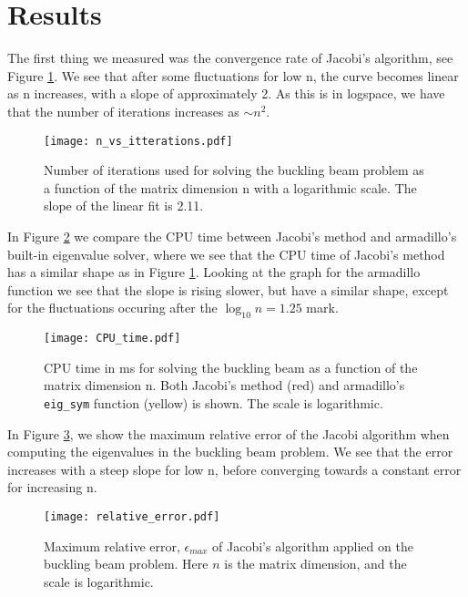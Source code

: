 \section{Results}
\label{sec:results}

The first thing we measured was the convergence rate of Jacobi's algorithm, see Figure \ref{fig:n_vs_it}.
We see that after some fluctuations for low n, the curve becomes linear as n increases, with a slope of approximately 2.
As this is in logspace, we have that the number of iterations increases as $\sim  n^2$.
\begin{figure}[htbp]
	\centering
	\texttt{[image: n\_vs\_itterations.pdf]}
	\caption{Number of iterations used for solving the buckling beam problem as a function of the matrix dimension n with a logarithmic scale. The slope of the linear fit is 2.11.}
	\label{fig:n_vs_it}
\end{figure}

In Figure \ref{fig:CPUtime} we compare the CPU time between Jacobi's method and
armadillo's built-in eigenvalue solver, where we see that the CPU time of Jacobi's method
has a similar shape as in Figure \ref{fig:n_vs_it}. Looking at the graph for the armadillo
function we see that the slope is rising slower, but have a similar shape, except
for the fluctuations occuring after the $\log_{10} n = 1.25$ mark.
\begin{figure}[htbp]
	\centering
	\texttt{[image: CPU\_time.pdf]}
	\caption{CPU time in ms for solving the buckling beam as a function of the matrix dimension n. Both Jacobi's method (red) and armadillo's \texttt{eig\_sym} function (yellow) is shown. The scale is logarithmic.}
	\label{fig:CPUtime}
\end{figure}

In Figure \ref{fig:error}, we show the maximum relative error of the Jacobi
algorithm when computing the eigenvalues in the buckling beam problem. We see that the error increases with a steep slope for low n, before converging towards a constant error for increasing n.
\begin{figure}[htbp]
	\centering
	\texttt{[image: relative\_error.pdf]}
	\caption{Maximum relative error, $\epsilon_{max}$ of Jacobi's algorithm applied on the buckling beam problem.
	Here $n$ is the matrix dimension, and the scale is logarithmic.}
	\label{fig:error}
\end{figure}

